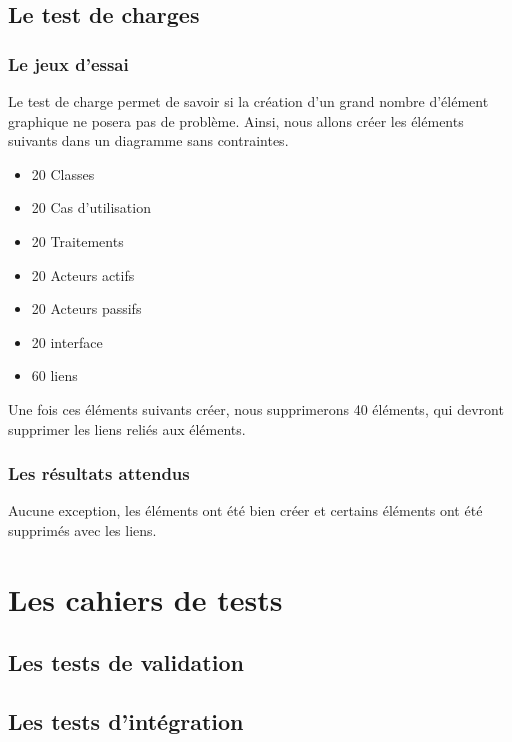 \documentclass[12pt,a4paper,openany]{report}
\begin{document}
	\section{Le test de charges}
		\subsection{Le jeux d'essai}
		Le test de charge permet de savoir si la création d'un grand nombre d'élément graphique ne posera pas de problème. 
		Ainsi, nous allons créer les éléments suivants dans un diagramme sans contraintes.
		\begin{itemize}
			\item 20 Classes
			\item 20 Cas d'utilisation
			\item 20 Traitements
			\item 20 Acteurs actifs
			\item 20 Acteurs passifs
			\item 20 interface 
			\item 60 liens
		\end{itemize}
		Une fois ces éléments suivants créer, nous supprimerons 40 éléments, qui devront supprimer les liens reliés aux éléments.
		\subsection{Les résultats attendus}
		Aucune exception, les éléments ont été bien créer et certains éléments ont été supprimés avec les liens.
	\chapter{Les cahiers de tests}	
	\section{Les tests de validation}
	\section{Les tests d'intégration}
\end{document}
